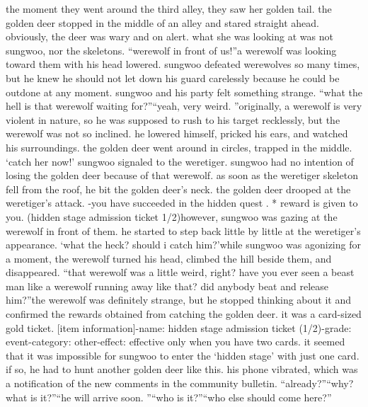 the moment they went around the third alley, they saw her golden tail.
the golden deer stopped in the middle of an alley and stared straight ahead.
 obviously, the deer was wary and on alert.
 what she was looking at was not sungwoo, nor the skeletons.
“werewolf in front of us!”a werewolf was looking toward them with his head lowered.
sungwoo defeated werewolves so many times, but he knew he should not let down his guard carelessly because he could be outdone at any moment.
sungwoo and his party felt something strange.
“what the hell is that werewolf waiting for?”“yeah, very weird.
”originally, a werewolf is very violent in nature, so he was supposed to rush to his target recklessly, but the werewolf was not so inclined.
 he lowered himself, pricked his ears, and watched his surroundings.
 the golden deer went around in circles, trapped in the middle.
‘catch her now!’ sungwoo signaled to the weretiger.
sungwoo had no intention of losing the golden deer because of that werewolf.
as soon as the weretiger skeleton fell from the roof, he bit the golden deer’s neck.
 the golden deer drooped at the weretiger’s attack.
-you have succeeded in the hidden quest .
* reward is given to you.
 (hidden stage admission ticket 1/2)however, sungwoo was gazing at the werewolf in front of them.
 he started to step back little by little at the weretiger’s appearance.
‘what the heck? should i catch him?’while sungwoo was agonizing for a moment, the werewolf turned his head, climbed the hill beside them, and disappeared.
“that werewolf was a little weird, right? have you ever seen a beast man like a werewolf running away like that? did anybody beat and release him?”the werewolf was definitely strange, but he stopped thinking about it and confirmed the rewards obtained from catching the golden deer.
 it was a card-sized gold ticket.
[item information]-name: hidden stage admission ticket (1/2)-grade: event-category: other-effect: effective only when you have two cards.
it seemed that it was impossible for sungwoo to enter the ‘hidden stage’ with just one card.
if so, he had to hunt another golden deer like this.
his phone vibrated, which was a notification of the new comments in the community bulletin.
“already?”“why? what is it?”“he will arrive soon.
”“who is it?”“who else should come here?”

